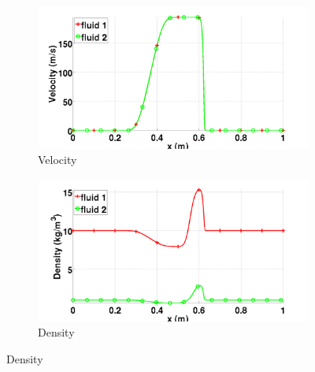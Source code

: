 \documentclass[preprint,10pt]{elsarticle}
\begin{document}
\begin{figure}[H]
        \centering
        \begin{subfigure}[b]{0.5\textwidth}
                \centering
                \includegraphics[width=\textwidth]{../figures/paper/relaxation_two_phases_velocity_fo_lf.png}
                \caption{Velocity}
                \label{fig:two-phase-vel}
        \end{subfigure}%
        \begin{subfigure}[b]{0.5\textwidth}
                \centering
                \includegraphics[width=\textwidth]{../figures/paper/relaxation_two_phases_density_fo_lf.png}
                \caption{Density}
                \label{fig:two-phase-density}
        \end{subfigure}
        

\end{figure}
\end{document}
